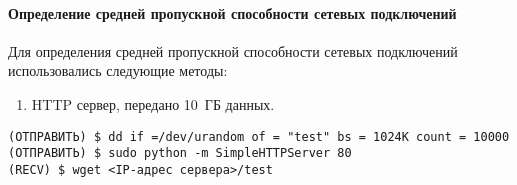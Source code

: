 %
%
%
%
%
%
%

\paragraph{Определение средней пропускной способности сетевых подключений}


Для определения средней пропускной способности сетевых подключений использовались следующие методы:

\begin{enumerate}
\setcounter{enumi}{0}
\item HTTP сервер, передано 10 \,ГБ данных.
\end{enumerate}

\noindent
\begin{lstlisting}
(ОТПРАВИТЬ) $ dd if =/dev/urandom of = "test" bs = 1024K count = 10000
(ОТПРАВИТЬ) $ sudo python -m SimpleHTTPServer 80
(RECV) $ wget <IP-адрес сервера>/test
\end{lstlisting}

